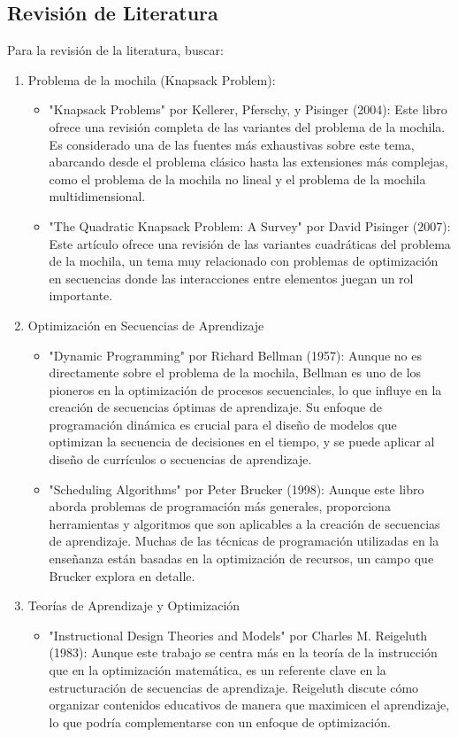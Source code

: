 \documentclass{article}
\begin{document}
\subsection{Revisión de Literatura}
Para la revisión de la literatura, buscar: 
\begin{enumerate}
    \item Problema de la mochila (Knapsack Problem):
    \begin{itemize}
    \item "Knapsack Problems" por Kellerer, Pferschy, y Pisinger (2004): Este libro ofrece una revisión completa de las variantes del problema de la mochila. Es considerado una de las fuentes más exhaustivas sobre este tema, abarcando desde el problema clásico hasta las extensiones más complejas, como el problema de la mochila no lineal y el problema de la mochila multidimensional.
    \item "The Quadratic Knapsack Problem: A Survey" por David Pisinger (2007): Este artículo ofrece una revisión de las variantes cuadráticas del problema de la mochila, un tema muy relacionado con problemas de optimización en secuencias donde las interacciones entre elementos juegan un rol importante.
\end{itemize}
    \item Optimización en Secuencias de Aprendizaje
    \begin{itemize}
        \item "Dynamic Programming" por Richard Bellman (1957): Aunque no es directamente sobre el problema de la mochila, Bellman es uno de los pioneros en la optimización de procesos secuenciales, lo que influye en la creación de secuencias óptimas de aprendizaje. Su enfoque de programación dinámica es crucial para el diseño de modelos que optimizan la secuencia de decisiones en el tiempo, y se puede aplicar al diseño de currículos o secuencias de aprendizaje.
        \item "Scheduling Algorithms" por Peter Brucker (1998): Aunque este libro aborda problemas de programación más generales, proporciona herramientas y algoritmos que son aplicables a la creación de secuencias de aprendizaje. Muchas de las técnicas de programación utilizadas en la enseñanza están basadas en la optimización de recursos, un campo que Brucker explora en detalle.
    \end{itemize}
    \item Teorías de Aprendizaje y Optimización
    \begin{itemize}
        \item "Instructional Design Theories and Models" por Charles M. Reigeluth (1983): Aunque este trabajo se centra más en la teoría de la instrucción que en la optimización matemática, es un referente clave en la estructuración de secuencias de aprendizaje. Reigeluth discute cómo organizar contenidos educativos de manera que maximicen el aprendizaje, lo que podría complementarse con un enfoque de optimización.

\end{itemize}
\end{enumerate}
\end{document}
